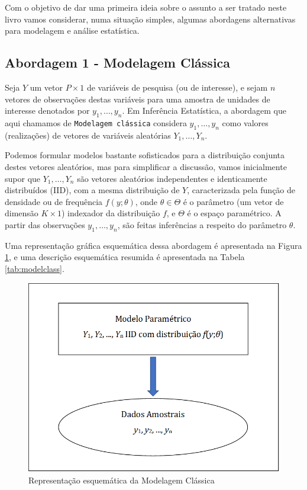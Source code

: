 \documentclass[]{book}
\theoremstyle{definition}
\theoremstyle{definition}
\theoremstyle{definition}
\theoremstyle{remark}
\begin{document}
Com o objetivo de dar uma primeira ideia sobre o assunto a ser tratado
neste livro vamos considerar, numa situação simples, algumas abordagens
alternativas para modelagem e análise estatística.

\subsection{Abordagem 1 - Modelagem
Clássica}\label{abordagem-1---modelagem-classica}

Seja \(Y\) um vetor \(P \times 1\) de variáveis de pesquisa (ou de
interesse), e sejam \(n\) vetores de observações destas variáveis para
uma amostra de unidades de interesse denotados por \(y_1,\ldots ,y_n\).
Em Inferência Estatística, a abordagem que aqui chamamos de
\texttt{Modelagem\ clássica} considera \(y_1,\ldots ,y_n\) como valores
(realizações) de vetores de variáveis aleatórias \(Y_1,\ldots ,Y_n\).

Podemos formular modelos bastante sofisticados para a distribuição
conjunta destes vetores aleatórios, mas para simplificar a discussão,
vamos inicialmente supor que \(Y_1,\ldots ,Y_n\) são vetores aleatórios
independentes e identicamente distribuídos (IID), com a mesma
distribuição de \(Y\), caracterizada pela função de densidade ou de
frequência \(f(y;\theta)\), onde \(\theta \in \Theta\) é o parâmetro (um
vetor de dimensão \(K \times 1\)) indexador da distribuição \(f\), e
\(\Theta\) é o espaço paramétrico. A partir das observações
\(y_1,\ldots ,y_n\), são feitas inferências a respeito do parâmetro
\(\theta\).

Uma representação gráfica esquemática dessa abordagem é apresentada na
Figura \ref{fig:modclas}, e uma descrição esquemática resumida é
apresentada na Tabela \ref{tab:modelclass}.

\begin{figure}
\centering
\includegraphics{Figuras/Figura2.1.png}
\caption{\label{fig:modclas}Representação esquemática da Modelagem Clássica}
\end{figure}
\end{document}
